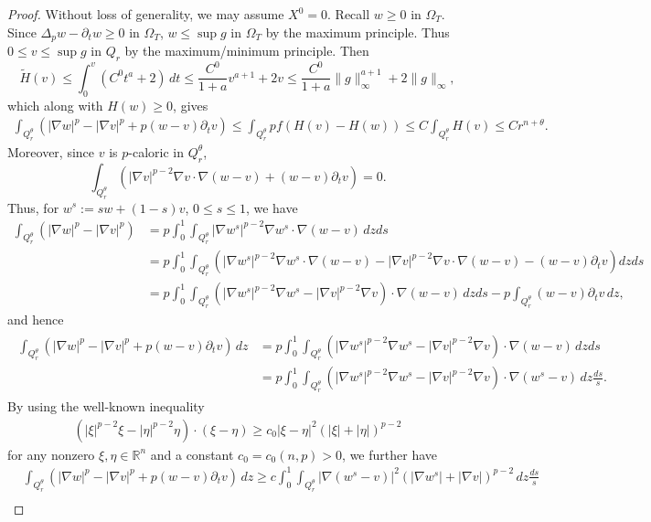 \documentclass[11pt,oneside,english]{amsart}
\newcommand{\R}{{\mathbb R}}
\newcommand{\D}{\nabla}
\numberwithin{equation}{section}
\theoremstyle{plain}
\numberwithin{equation}{section}
\begin{document}
\begin{proof}
Without loss of generality, we may assume $X^0=0$. Recall $w\ge0$ in $\Omega_T$. Since $\Delta_pw-\partial_tw\ge0$ in $\Omega_T$, $w\le\sup g$ in $\Omega_T$ by the maximum principle. Thus $0\le v\le \sup g$ in $Q_r$ by the maximum/minimum principle. Then 
$$
\tilde H(v)\le \int_0^v(C^0t^a+2)\,dt\le \frac{C^0}{1+a}v^{a+1}+2v\le \frac{C^0}{1+a}\|g\|_\infty^{a+1}+2\|g\|_\infty,
$$
which along with $H(w)\ge0$, gives
\begin{align}\label{eq:u-v-est-0}
    \int_{Q_r^\theta}\left(|\D w|^p-|\D v|^p+p(w-v)\partial_tv\right)\le \int_{Q_r^\theta}pf(H(v)-H(w))\le C\int_{Q_r^\theta}H(v)\le Cr^{n+\theta}.
\end{align}
Moreover, since $v$ is $p$-caloric in $Q_r^\theta$,
$$
\int_{Q_r^\theta}\left(|\D v|^{p-2}\D v\cdot\D(w-v)+(w-v)\partial_tv  \right)=0. 
$$
Thus, for $w^s:=sw+(1-s)v$, $0\le s\le 1$, we have
\begin{align*}
    \int_{Q_r^\theta}\left(|\D w|^p-|\D v|^p\right)
    &=p\int_0^1\int_{Q_r^\theta}|\D w^s|^{p-2}\D w^s\cdot\D(w-v)\,dzds\\
    &=p\int_0^1\int_{Q_r^\theta}\left(|\D w^s|^{p-2}\D w^s\cdot\D(w-v)-|\D v|^{p-2}\D v\cdot\D(w-v)-(w-v)\partial_tv\right)dzds\\
    &=p\int_0^1\int_{Q_r^\theta}\left(|\D w^s|^{p-2}\D w^s-|\D v|^{p-2}\D v\right)\cdot \D(w-v)\,dzds-p\int_{Q_r^\theta}(w-v)\partial_tv\,dz,
\end{align*}
and hence
\begin{align}
    \label{eq:u-v-est-diff-sing}
    \begin{split}
        \int_{Q_r^\theta}\left(|\D w|^p-|\D v|^p+p(w-v)\partial_tv\right)\,dz&=p\int_0^1\int_{Q_r^\theta}\left(|\D w^s|^{p-2}\D w^s-|\D v|^{p-2}\D v\right)\cdot\D(w-v)\,dzds\\
    &=p\int_0^1\int_{Q_r^\theta}\left(|\D w^s|^{p-2}\D w^s-|\D v|^{p-2}\D v\right)\cdot\D(w^s-v)\,dz\frac{ds}s.
    \end{split}
\end{align}
By using the well-known inequality
\begin{align}\label{eq:ineq-sing}
\left(|\xi|^{p-2}\xi-|\eta|^{p-2}\eta\right)\cdot(\xi-\eta)\ge c_0|\xi-\eta|^2(|\xi|+|\eta|)^{p-2}
\end{align}
for any nonzero $\xi,\eta\in\R^n$ and a constant $c_0=c_0(n,p)>0$, we further have
\begin{align*}
    &\int_{Q_r^\theta}\left(|\D w|^p-|\D v|^p+p(w-v)\partial_tv\right)\,dz\ge c\int_0^1\int_{Q_r^\theta}|\D(w^s-v)|^2\left(|\D w^s|+|\D v|\right)^{p-2}\,dz\frac{ds}s\\

\end{align*}
\end{proof}
\end{document}
